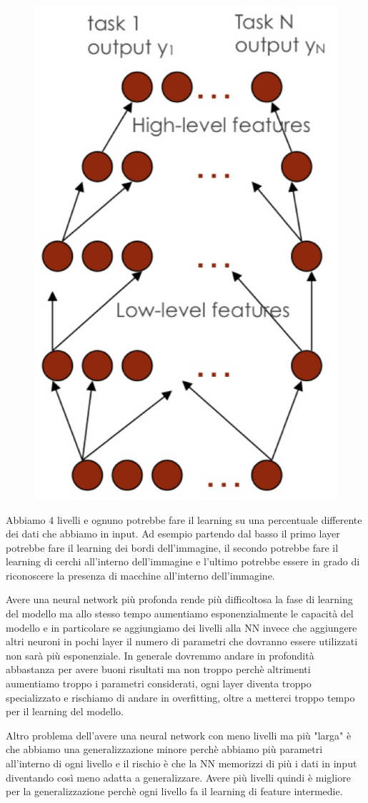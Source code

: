 \documentclass[14pt]{extreport}
\begin{document}
\begin{figure}[H]
\centering
\includegraphics[width=0.5\linewidth]{372.jpeg}
\end{figure}

Abbiamo 4 livelli e ognuno potrebbe fare il learning su una percentuale differente dei dati che abbiamo in input. Ad esempio partendo dal basso il
primo layer potrebbe fare il learning dei bordi dell'immagine, il secondo potrebbe fare il learning di cerchi all'interno dell'immagine e l'ultimo
potrebbe essere in grado di riconoscere la presenza di macchine all'interno dell'immagine.

Avere una neural network più profonda rende più difficoltosa la fase di learning del modello ma allo stesso tempo aumentiamo esponenzialmente le
capacità del modello e in particolare se aggiungiamo dei livelli alla NN invece che aggiungere altri neuroni in pochi layer il numero di parametri che
dovranno essere utilizzati non sarà più esponenziale. In generale dovremmo andare in profondità abbastanza per avere buoni risultati ma non troppo
perchè altrimenti aumentiamo troppo i parametri considerati, ogni layer diventa troppo specializzato e rischiamo di andare in overfitting, oltre a
metterci troppo tempo per il learning del modello.

Altro problema dell'avere una neural network con meno livelli ma più "larga" è che abbiamo una generalizzazione minore perchè abbiamo più parametri
all'interno di ogni livello e il rischio è che la NN memorizzi di più i dati in input diventando così meno adatta a generalizzare. Avere più livelli
quindi è migliore per la generalizzazione perchè ogni livello fa il learning di feature intermedie.
\end{document}
